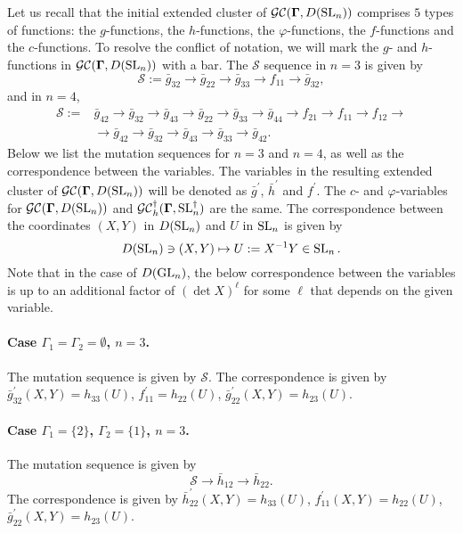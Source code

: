 Let us recall that the initial extended cluster of $\mathcal{GC}(\mathbf{\Gamma},D(\operatorname{SL}_n))$ comprises $5$ types of functions: the $g$-functions, the $h$-functions, the $\varphi$-functions, the $f$-functions and the $c$-functions. To resolve the conflict of notation, we will mark the $g$- and $h$-functions in $\mathcal{GC}(\mathbf{\Gamma},D(\operatorname{SL}_n))$ with a bar. The $\mathcal{S}$ sequence in $n=3$ is given by
\begin{equation}
    \mathcal{S}:= \bar{g}_{32}\rightarrow \bar{g}_{22}\rightarrow \bar{g}_{33}\rightarrow f_{11}\rightarrow \bar{g}_{32},
\end{equation}
and in $n=4$,
\begin{equation}
\begin{split}
    \mathcal{S}:=&\bar{g}_{42}\rightarrow \bar{g}_{32}\rightarrow \bar{g}_{43} \rightarrow \bar{g}_{22}\rightarrow \bar{g}_{33}\rightarrow \bar{g}_{44}\rightarrow f_{21}\rightarrow f_{11}\rightarrow f_{12} \rightarrow \\ &\rightarrow \bar{g}_{42}\rightarrow \bar{g}_{32}\rightarrow \bar{g}_{43} \rightarrow \bar{g}_{33} \rightarrow \bar{g}_{42}.
\end{split}
\end{equation}
Below we list the mutation sequences for $n=3$ and $n=4$, as well as the correspondence between the variables. The variables in the resulting extended cluster of $\mathcal{GC}(\mathbf{\Gamma},D(\operatorname{SL}_n))$ will be denoted as $\bar{g}^{\prime}$, $\bar{h}^\prime$ and $f^{\prime}$. The $c$- and $\varphi$-variables for $\mathcal{GC}(\mathbf{\Gamma},D(\operatorname{SL}_n))$ and $\mathcal{GC}_h^{\dagger}(\mathbf{\Gamma},\operatorname{SL}_n^{\dagger})$ are the same. The correspondence between the coordinates $(X,Y)$ in $D(\operatorname{SL}_n)$ and $U$ in $\operatorname{SL}_n$ is given by 
\[D(\operatorname{SL}_n)\ni (X,Y) \mapsto U:=X^{-1}Y \in \operatorname{SL}_n.\] Note that in the case of $D(\operatorname{GL}_n)$, the below correspondence between the variables is up to an additional factor of $(\det X)^{\ell}$ for some $\ell$ that depends on the given variable.

\paragraph{Case $\Gamma_1=\Gamma_2=\emptyset$, $n=3$.} The mutation sequence is given by $\mathcal{S}$. The correspondence is given by $\bar{g}_{32}^{\prime}(X,Y) = h_{33}(U)$, $f_{11}^{\prime} = h_{22}(U)$, $\bar{g}^{\prime}_{22}(X,Y) = h_{23}(U)$.

\paragraph{Case $\Gamma_1 = \{2\}$, $\Gamma_2 = \{1\}$, $n=3$.} The mutation sequence is given by
\begin{equation}
    \mathcal{S}\rightarrow \bar{h}_{12} \rightarrow \bar{h}_{22}.
\end{equation}
The correspondence is given by $\bar{h}_{22}^{\prime}(X,Y) = h_{33}(U)$, $f_{11}^\prime(X,Y) = h_{22}(U)$, $\bar{g}_{22}^{\prime}(X,Y) = h_{23}(U)$.

